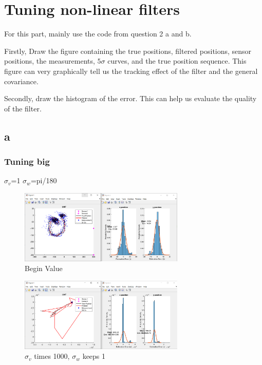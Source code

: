 \section{Tuning non-linear filters}

For this part, mainly use the code from question 2 a and b. 

Firstly, Draw the figure containing the true positions, filtered positions, sensor positions, the measurements, $ 5 \sigma $ curves,  and the true position sequence. This figure can very graphically tell us the tracking effect of the filter and the general covariance.

Secondly, draw the histogram of the error. This can help us evaluate the quality of the filter.

\subsection{a}
\subsubsection{Tuning big}

$\sigma_v$=1 $\sigma_w$=pi/180

\begin{figure}[H]
 \centering
 \includegraphics[width=0.7\textwidth]{images/begin.png}
 \caption{Begin Value}
 \label{31}
\end{figure}

\begin{figure}[H]
 \centering
 \includegraphics[width=0.7\textwidth]{images/sigmav1000.png}
 \caption{$\sigma_v$ times 1000, $\sigma_w$ keeps 1}
 \label{v1000}
\end{figure}

